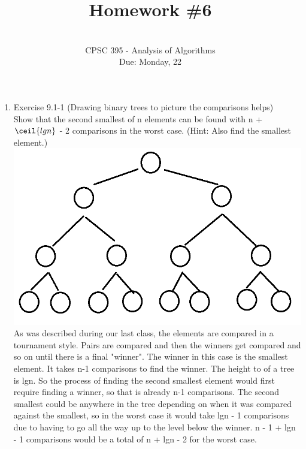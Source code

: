 \documentclass[12pt]{article}
\begin{document}
 
 
 
\title{Homework \#6}%
\author{\\ %
CPSC 395 - Analysis of Algorithms
\\ Due: Monday, 22} %
\date{}
\maketitle

\begin{enumerate}
\item Exercise 9.1-1 (Drawing binary trees to picture the comparisons helps)\\
Show that the second smallest of n elements can be found with n + $\ceil{lgn}$ - 2 comparisons in the worst case. (Hint: Also find the smallest element.) \\

\includegraphics[scale=.25]{9.1.1.png} \\
As was described during our last class, the elements are compared in a tournament style. Pairs are compared and then the winners get compared and so on until there is a final "winner". The winner in this case is the smallest element. It takes n-1 comparisons to find the winner. The height to of a tree is lgn. So the process of finding the second smallest element would first require finding a winner, so that is already n-1 comparisons. The second smallest could be anywhere in the tree depending on when it was compared against the smallest, so in the worst case it would take lgn - 1 comparisons due to having to go all the way up to the level below the winner. n - 1 + lgn - 1 comparisons would be a total of n + lgn - 2 for the worst case.


\end{enumerate}
\end{document}
